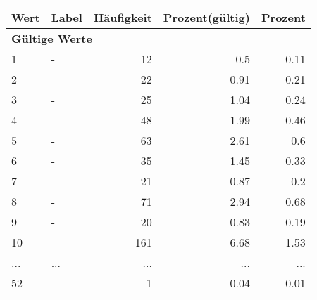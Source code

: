      \begin{longtable}{lXrrr}
     \toprule
     \textbf{Wert} & \textbf{Label} & \textbf{Häufigkeit} & \textbf{Prozent(gültig)} & \textbf{Prozent} \\
     \endhead
     \midrule
     \multicolumn{5}{l}{\textbf{Gültige Werte}}\\
        1 & \multicolumn{1}{X}{-} & %
          \num{12} &
          \num[round-mode=places,round-precision=2]{0.5} &
          \num[round-mode=places,round-precision=2]{0.11} \\
        2 & \multicolumn{1}{X}{-} & %
          \num{22} &
          \num[round-mode=places,round-precision=2]{0.91} &
          \num[round-mode=places,round-precision=2]{0.21} \\
        3 & \multicolumn{1}{X}{-} & %
          \num{25} &
          \num[round-mode=places,round-precision=2]{1.04} &
          \num[round-mode=places,round-precision=2]{0.24} \\
        4 & \multicolumn{1}{X}{-} & %
          \num{48} &
          \num[round-mode=places,round-precision=2]{1.99} &
          \num[round-mode=places,round-precision=2]{0.46} \\
        5 & \multicolumn{1}{X}{-} & %
          \num{63} &
          \num[round-mode=places,round-precision=2]{2.61} &
          \num[round-mode=places,round-precision=2]{0.6} \\
        6 & \multicolumn{1}{X}{-} & %
          \num{35} &
          \num[round-mode=places,round-precision=2]{1.45} &
          \num[round-mode=places,round-precision=2]{0.33} \\
        7 & \multicolumn{1}{X}{-} & %
          \num{21} &
          \num[round-mode=places,round-precision=2]{0.87} &
          \num[round-mode=places,round-precision=2]{0.2} \\
        8 & \multicolumn{1}{X}{-} & %
          \num{71} &
          \num[round-mode=places,round-precision=2]{2.94} &
          \num[round-mode=places,round-precision=2]{0.68} \\
        9 & \multicolumn{1}{X}{-} & %
          \num{20} &
          \num[round-mode=places,round-precision=2]{0.83} &
          \num[round-mode=places,round-precision=2]{0.19} \\
        10 & \multicolumn{1}{X}{-} & %
          \num{161} &
          \num[round-mode=places,round-precision=2]{6.68} &
          \num[round-mode=places,round-precision=2]{1.53} \\
       ... & ... & ... & ... & ... \\
        52 & \multicolumn{1}{X}{-} & %
          \num{1} &
          \num[round-mode=places,round-precision=2]{0.04} &
          \num[round-mode=places,round-precision=2]{0.01} \\


\end{longtable}
